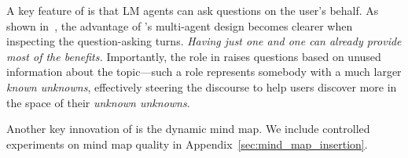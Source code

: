 A key feature of \system is that LM agents can ask questions on the user's behalf. As shown in~, the advantage of \system's multi-agent design becomes clearer when inspecting the question-asking turns. \textit{Having just one \expert and one \moderator can already provide most of the benefits.} Importantly, the \moderator role in \system raises questions based on unused information about the topic---such a role represents somebody with a much larger \textit{known unknowns}, effectively steering the discourse to help users discover more in the space of their \textit{unknown unknowns}.

Another key innovation of \system is the dynamic mind map. %
We include controlled experiments on mind map quality in Appendix~\ref{sec:mind_map_insertion}.



